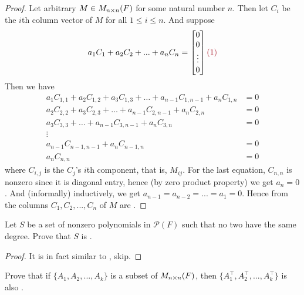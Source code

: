 \begin{proof}
Let arbitrary \(M \in M_{n \times n}(F)\) for some natural number \(n\).
Then let \(C_i\) be the \(i\)th column vector of \(M\) for all \(1 \le i \le n\).
And suppose
\[
    a_1 C_1 + a_2 C_2 + ... + a_n C_n = \begin{bmatrix}
        0 \\
        0 \\
        \vdots \\
        0
    \end{bmatrix} \MAROON{(1)}
\]
Then we have
\[
\begin{aligned}
a_{1} C_{1, 1} + a_{2} C_{1, 2} + a_{3} C_{1, 3} + \ldots + a_{n-1} C_{1, n-1} + a_{n} C_{1, n} & = 0 \\
                 a_{2} C_{2, 2} + a_{3} C_{2, 3} + \ldots + a_{n-1} C_{2, n-1} + a_{n} C_{2, n} & = 0 \\
                                  a_{3} C_{3, 3} + \ldots + a_{n-1} C_{3, n-1} + a_{n} C_{3, n} & = 0 \\
                                                                                         \vdots & \\
                                                            a_{n-1} C_{n-1, n-1} + a_{n} C_{n-1, n} & = 0 \\
                                                                                 a_{n} C_{n, n} & = 0
\end{aligned}
\]
where \(C_{i,j}\) is the \(C_j\)'s \(i\)th component, that is, \(M_{ij}\).
For the last equation, \(C_{n,n}\) is nonzero since it is diagonal entry, hence (by zero product property) we get \(a_n = 0\).
And (informally) inductively, we get \(a_{n - 1} = a_{n - 2} = ... = a_1 = 0\).
Hence from  the columns \(C_1, C_2, ..., C_n\) of \(M\) are \LID{}.
\end{proof}

\begin{exercise} \label{exercise 1.5.18}
Let \(S\) be a set of nonzero polynomials in \(\mathcal{P}(F)\) such that no two have the same degree. 
Prove that \(S\) is \LID{}.
\end{exercise}

\begin{proof}
It is in fact similar to , skip.
\end{proof}

\begin{exercise} \label{exercise 1.5.19}
Prove that if \(\{ A_1, A_2, ..., A_k \}\) is a \LID{} subset of \(M_{n \times n}(F)\), then \(\{ A^\top_1, A^\top_2, ..., A^\top_k \}\) is also \LID{}.
\end{exercise}


